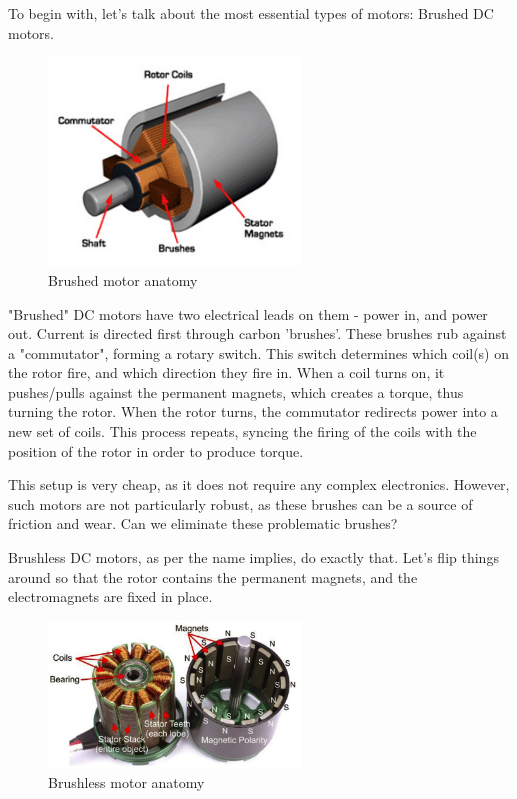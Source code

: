 \documentclass[10pt,letterpaper]{book}
\begin{document}
To begin with, let's talk about the most essential types of motors: Brushed DC motors.

\begin{figure}[H]\centering
\includegraphics[width=0.6\textwidth]{imgs/img_Mechatronics_Motors_brushed.png}
\caption{Brushed motor anatomy}
\end{figure}

"Brushed" DC motors have two electrical leads on them - power in, and power out. Current is directed first through carbon 'brushes'. These brushes rub against a "commutator", forming a rotary switch. This switch determines which coil(s) on the rotor fire, and which direction they fire in. When a coil turns on, it pushes/pulls against the permanent magnets, which creates a torque, thus turning the rotor. When the rotor turns, the commutator redirects power into a new set of coils. This process repeats, syncing the firing of the coils with the position of the rotor in order to produce torque. 


This setup is very cheap, as it does not require any complex electronics. However, such motors are not particularly robust, as these brushes can be a source of friction and wear. Can we eliminate these problematic brushes?

Brushless DC motors, as per the name implies, do exactly that. Let's flip things around so that the rotor contains the permanent magnets, and the electromagnets are fixed in place.
\begin{figure}[H]\centering
\includegraphics[width=0.6\textwidth]{imgs/img_Mechatronics_Motors_brushless.png}
\caption{Brushless motor anatomy}
\end{figure}
\end{document}
